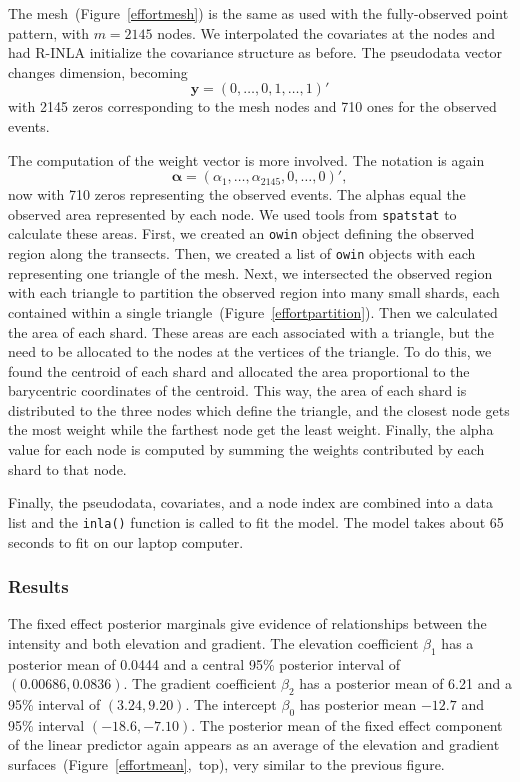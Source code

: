 \documentclass[]{interact}
\begin{document}
The mesh~(Figure~\ref{effortmesh}) is the same as used with the fully-observed
point pattern, with \(m = 2145\) nodes. We interpolated the covariates
at the nodes and had R-INLA initialize the covariance structure as
before. The pseudodata vector changes dimension, becoming
\begin{equation}
\mathbf{y} = (0, \dots, 0, 1, \dots, 1)'
\end{equation}
with 2145 zeros corresponding to the mesh nodes and 710 ones for the observed
events.

The computation of the weight vector is more involved. The notation is again
\begin{equation}
\boldsymbol{\alpha} = (\alpha_{1}, \dots, \alpha_{2145}, 0, \dots, 0)',
\end{equation}
now with 710 zeros representing the observed events. The alphas equal the
observed area represented by each node. We used tools from \texttt{spatstat}
to calculate these areas. First, we created an \texttt{owin} object defining
the observed region along the transects. Then, we created a list of
\texttt{owin} objects with each representing one triangle of the mesh. Next,
we intersected the observed region with each triangle to partition the observed
region into many small shards, each contained within a single
triangle~(Figure~\ref{effortpartition}). Then we calculated the area of each
shard. These areas are each associated with a triangle, but the need to be
allocated to the nodes at the vertices of the triangle. To do this, we found
the centroid of each shard and allocated the area proportional to the
barycentric coordinates of the centroid. This way, the area of each shard is
distributed to the three nodes which define the triangle, and the closest node
gets the most weight while the farthest node get the least weight. Finally,
the alpha value for each node is computed by summing the weights contributed
by each shard to that node.

Finally, the pseudodata, covariates, and a node index are combined into a data
list and the \texttt{inla()} function is called to fit the model. The model
takes about 65 seconds to fit on our laptop computer.


\subsubsection{Results}
\label{xsectresults}

The fixed effect posterior marginals give evidence of relationships between
the intensity and both elevation and gradient. The elevation coefficient
\(\beta_{1}\) has a posterior mean of 0.0444 and a central 95\% posterior
interval of \((0.00686, 0.0836)\). The gradient coefficient \(\beta_{2}\) has
a posterior mean of 6.21 and a 95\% interval of \((3.24, 9.20)\). The
intercept \(\beta_{0}\) has posterior mean \(-12.7\) and 95\% interval
\((-18.6, -7.10)\). The posterior mean of the fixed effect component of the
linear predictor again appears as an average of the elevation and gradient
surfaces~(Figure~\ref{effortmean},~top), very similar to the previous figure.
\end{document}
